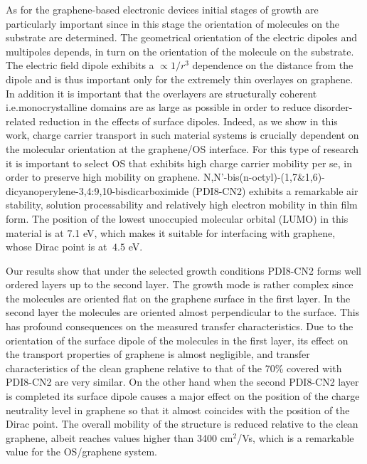 \documentclass[preprint,aip,jap]{revtex4-2}
\begin{document}
As for the graphene-based electronic devices initial stages of growth are particularly important since in this stage the orientation of molecules on the substrate are determined.
 The geometrical orientation of the electric dipoles and multipoles depends, in turn on the orientation of the molecule on the substrate\cite{geng-2012}.
 The electric field dipole exhibits a $\propto 1/r^{3}$ dependence on the distance from the dipole and is thus important only for the extremely thin overlayes on graphene.
 In addition it is important that the overlayers are structurally coherent i.e.monocrystalline domains are as large as possible in order to reduce disorder-related reduction in the effects of surface dipoles.
 Indeed, as  we show in this work, charge carrier transport in such material systems is crucially dependent on the molecular orientation at the graphene/OS interface.
 For this type of research it is important to select OS that exhibits high charge carrier mobility per se, in order to preserve high mobility on graphene.
   N,N'-bis(n-octyl)-(1,7\&1,6)-dicyanoperylene-3,4:9,10-bisdicarboximide (PDI8-CN2)
 exhibits a remarkable air stability, solution processability and relatively high electron mobility in thin film form\cite{jung-2014,molinari-2009,piliego-2009a}.  The position of the lowest unoccupied molecular orbital (LUMO) in this material is at 7.1 eV\cite{jung-2014}, which makes it suitable for interfacing with graphene, whose Dirac point is at $~4.5$ eV.


Our results show that under the selected growth conditions PDI8-CN2 forms well ordered layers up to the second layer.
 The growth mode is rather complex since the molecules are oriented flat on the graphene surface in the first layer.
 In the second layer the molecules are oriented almost perpendicular to the surface.
 This has profound consequences on the measured transfer characteristics.
 Due to the orientation of the surface dipole of the molecules in the first layer, its effect on the transport properties of graphene is almost negligible, and transfer characteristics of the clean graphene relative to that of the 70\% covered with PDI8-CN2 are very similar. On the other hand when the second PDI8-CN2 layer is completed its surface dipole causes a major effect on the position of the charge neutrality level in graphene so that it almost coincides with the position of the Dirac point.
  The overall mobility of the structure is reduced relative to the clean graphene, albeit reaches values higher than 3400 cm$^{2}$/Vs, which is a remarkable value for the OS/graphene system.
 
\end{document}
